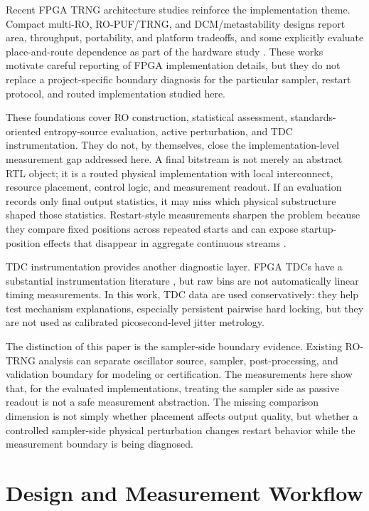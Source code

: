 \documentclass[journal]{IEEEtran}
\newcommand{\rotrng}{RO-TRNG}
\newcommand{\tdc}{TDC}
\begin{document}
Recent FPGA TRNG architecture studies reinforce the implementation theme. Compact multi-RO, RO-PUF/TRNG, and DCM/metastability designs report area, throughput, portability, and platform tradeoffs, and some explicitly evaluate place-and-route dependence as part of the hardware study \cite{Nannipieri_2021,RojasMunoz_2022,Frustaci_2023}. These works motivate careful reporting of FPGA implementation details, but they do not replace a project-specific boundary diagnosis for the particular sampler, restart protocol, and routed implementation studied here.

These foundations cover RO construction, statistical assessment, standards-oriented entropy-source evaluation, active perturbation, and TDC instrumentation. They do not, by themselves, close the implementation-level measurement gap addressed here. A final bitstream is not merely an abstract RTL object; it is a routed physical implementation with local interconnect, resource placement, control logic, and measurement readout. If an evaluation records only final output statistics, it may miss which physical substructure shaped those statistics. Restart-style measurements sharpen the problem because they compare fixed positions across repeated starts and can expose startup-position effects that disappear in aggregate continuous streams \cite{Turan_2018}.

\tdc{} instrumentation provides another diagnostic layer. FPGA \tdc{}s have a substantial instrumentation literature \cite{Jian_Song_2006,Wu_2009,Wu_2012,Wang_2017}, but raw bins are not automatically linear timing measurements. In this work, \tdc{} data are used conservatively: they help test mechanism explanations, especially persistent pairwise hard locking, but they are not used as calibrated picosecond-level jitter metrology.

The distinction of this paper is the sampler-side boundary evidence. Existing \rotrng{} analysis can separate oscillator source, sampler, post-processing, and validation boundary for modeling or certification. The measurements here show that, for the evaluated implementations, treating the sampler side as passive readout is not a safe measurement abstraction. The missing comparison dimension is not simply whether placement affects output quality, but whether a controlled sampler-side physical perturbation changes restart behavior while the measurement boundary is being diagnosed.

\section{Design and Measurement Workflow}
\end{document}
